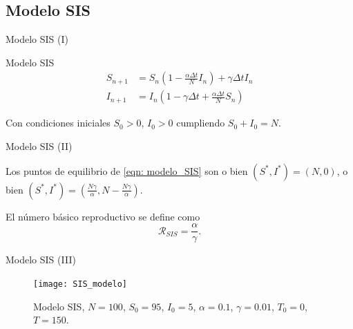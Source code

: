 \subsection{Modelo SIS}


\begin{frame}{Modelo SIS (I)}
    \begin{block}{Modelo SIS \cite{allenDiscretetimeSISIR1994}}
        \begin{equation}
            \label{eqn: modelo_SIS}
            \begin{aligned}
            S_{n+1} & = S_n \left(1-\frac{\alpha\Delta t}{N} I_n \right) + \gamma \Delta t I_n \\
            I_{n+1} & = I_n \left( 1-\gamma \Delta t + \frac{\alpha\Delta t}{N} S_n \right)
            \end{aligned}
            \end{equation}
            
            Con condiciones iniciales $S_0>0$, $I_0>0$ cumpliendo $S_0+I_0=N$.
    \end{block}
\end{frame}


\begin{frame}{Modelo SIS (II)}

    \begin{lema}
        Los puntos de equilibrio de \eqref{eqn: modelo_SIS} son o bien $(S^*,I^*)=(N,0)$, o bien $(S^*,I^*)=(\frac{N\gamma}{\alpha}, N-\frac{N\gamma}{\alpha})$.
    \end{lema}

    \pause

    \begin{definition}
        El número básico reproductivo se define como 
        $$\mathcal{R}_{SIS}=\frac{\alpha}{\gamma}.$$
    \end{definition}
\end{frame}


\begin{frame}{Modelo SIS (III)}


    \begin{figure}
        \begin{center}
        \caption{Modelo SIS, $N=100$, $S_0=95$, $I_0 = 5$, $\alpha = 0.1$, $\gamma=0.01$, $T_0 = 0$, $T = 150$.}
        \texttt{[image: SIS\_modelo]}
        \end{center}
    \end{figure}

\end{frame}


